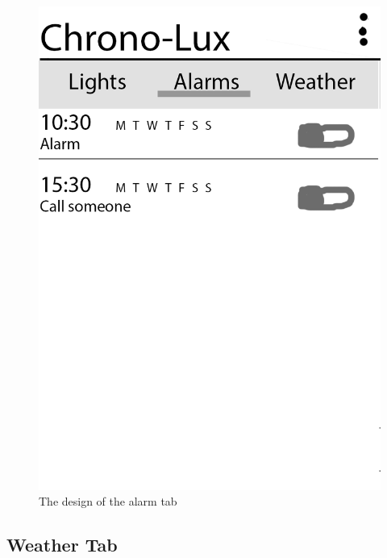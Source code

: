 \begin{figure}[H]
\centering
\includegraphics[scale=0.2]{Images/designs/AppDesign_05.png}
\caption{The design of the alarm tab}
\end{figure}

\subsection{Weather Tab}


